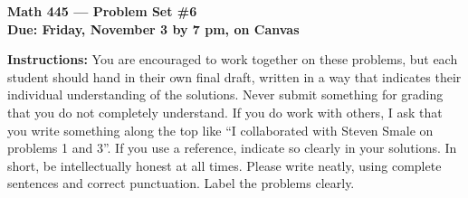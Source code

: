 \documentclass{amsart}
\begin{document}
\begin{center}
{\large\bfseries
Math 445 --- Problem Set \#6 \\
Due: Friday, November 3 by 7 pm, on Canvas}
\end{center}





{\bf Instructions:} You are encouraged to work together on these
problems, but each student should hand in their own final draft,
written in a way that indicates their individual understanding of
the solutions. Never submit something for grading
that you do not completely understand. If you do work with others, I ask that you write something along the
top like ``I collaborated with Steven Smale on problems 1 and 3''.
If you use a reference, indicate so clearly in your solutions. 
In short, be intellectually
honest at all times. Please write neatly, using complete sentences and correct
punctuation. Label the problems clearly. 
\end{document}
